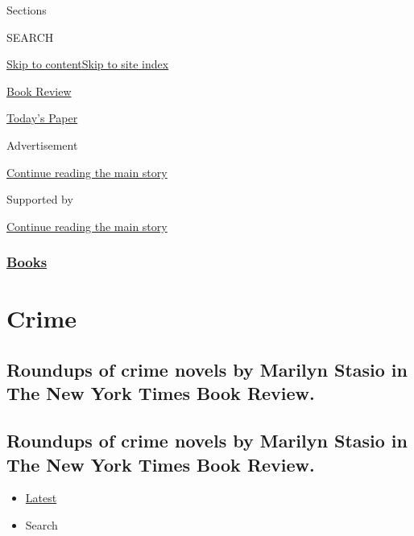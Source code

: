 Sections

SEARCH

\protect\hyperlink{site-content}{Skip to
content}\protect\hyperlink{site-index}{Skip to site index}

\href{https://www.nytimes.com/section/books/review}{Book Review}

\href{https://myaccount.nytimes.com/auth/login?response_type=cookie\&client_id=vi}{}

\href{https://www.nytimes.com/section/todayspaper}{Today's Paper}

Advertisement

\protect\hyperlink{after-top}{Continue reading the main story}

Supported by

\protect\hyperlink{after-sponsor}{Continue reading the main story}

\hypertarget{books}{%
\subsubsection{\texorpdfstring{\href{/section/books}{Books}}{Books}}\label{books}}

\hypertarget{crime}{%
\section{Crime}\label{crime}}

\hypertarget{roundups-of-crime-novels-by-marilyn-stasio-in-the-new-york-times-book-review}{%
\subsection{Roundups of crime novels by Marilyn Stasio in The New York
Times Book
Review.}\label{roundups-of-crime-novels-by-marilyn-stasio-in-the-new-york-times-book-review}}

\hypertarget{roundups-of-crime-novels-by-marilyn-stasio-in-the-new-york-times-book-review-1}{%
\subsection{Roundups of crime novels by Marilyn Stasio in The New York
Times Book
Review.}\label{roundups-of-crime-novels-by-marilyn-stasio-in-the-new-york-times-book-review-1}}

\begin{itemize}
\tightlist
\item
  \protect\hyperlink{stream-panel}{Latest}
\item
  Search
\end{itemize}

